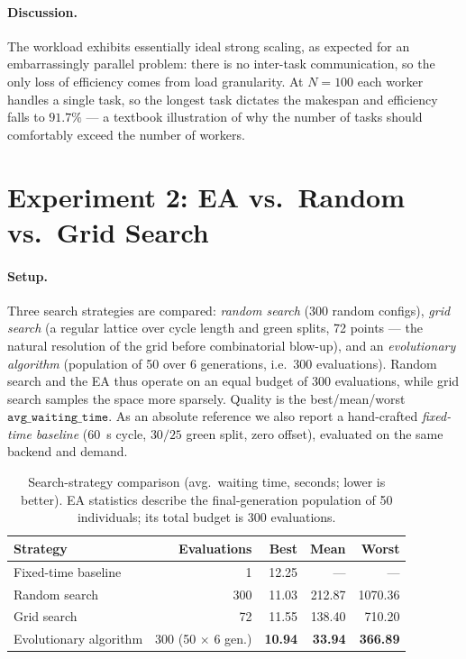 \documentclass[11pt,a4paper]{article}
\begin{document}
\paragraph{Discussion.} The workload exhibits essentially ideal strong scaling, as
expected for an embarrassingly parallel problem: there is no inter-task
communication, so the only loss of efficiency comes from load granularity. At
$N=100$ each worker handles a single task, so the longest task dictates the
makespan and efficiency falls to $91.7\%$ --- a textbook illustration of why the
number of tasks should comfortably exceed the number of workers.

\section{Experiment 2: EA vs.\ Random vs.\ Grid Search}

\paragraph{Setup.} Three search strategies are compared: \emph{random search}
(300 random configs), \emph{grid search} (a regular lattice over cycle length and
green splits, 72 points --- the natural resolution of the grid before
combinatorial blow-up), and an \emph{evolutionary algorithm} (population of 50
over 6 generations, i.e.\ 300 evaluations). Random search and the EA thus operate
on an equal budget of 300 evaluations, while grid search samples the space more
sparsely. Quality is the best/mean/worst $\texttt{avg\_waiting\_time}$. As an
absolute reference we also report a hand-crafted \emph{fixed-time baseline}
(\SI{60}{\second} cycle, $30/25$ green split, zero offset), evaluated on the same
backend and demand.

\begin{table}[H]
\centering
\caption{Search-strategy comparison (avg.\ waiting time, seconds; lower is
better). EA statistics describe the final-generation population of 50
individuals; its total budget is 300 evaluations.}
\begin{tabular}{lrrrr}
\toprule
Strategy & Evaluations & Best & Mean & Worst \\
\midrule
Fixed-time baseline & 1 & 12.25 & --- & --- \\
Random search & 300 & 11.03 & 212.87 & 1070.36 \\
Grid search   & 72  & 11.55 & 138.40 & 710.20  \\
Evolutionary algorithm & 300 (50 $\times$ 6 gen.) & \textbf{10.94} & \textbf{33.94} & \textbf{366.89} \\
\bottomrule
\end{tabular}
\end{table}
\end{document}
